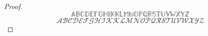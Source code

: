 \documentclass{article}
\theoremstyle{axiom} \newtheorem{axiom}{Axiom}
\theoremstyle{definition} \newtheorem{definition}{Definition}
\theoremstyle{example} \newtheorem{example}{Example}
\newcommand{\A}{\mathbb{A}}  \newcommand{\B}{\mathbb{B}}
\newcommand{\C}{\mathbb{C}}  \newcommand{\D}{\mathbb{D}}
\newcommand{\E}{\mathbb{E}}  \newcommand{\F}{\mathbb{F}}
\newcommand{\bG}{\mathbb{G}} \newcommand{\bH}{\mathbb{H}}
\newcommand{\I}{\mathbb{I}}  \newcommand{\J}{\mathbb{K}}
\newcommand{\K}{\mathbb{K}}  \newcommand{\bL}{\mathbb{L}}
\newcommand{\M}{\mathbb{M}}  \newcommand{\N}{\mathbb{N}}
\newcommand{\bO}{\mathbb{O}} \newcommand{\bP}{\mathbb{P}}
\newcommand{\Q}{\mathbb{Q}}  \newcommand{\R}{\mathbb{R}}
\newcommand{\bS}{\mathbb{S}} \newcommand{\T}{\mathbb{T}}
\newcommand{\U}{\mathbb{U}}  \newcommand{\V}{\mathbb{V}}
\newcommand{\W}{\mathbb{W}}  \newcommand{\X}{\mathbb{X}}
\newcommand{\Y}{\mathbb{Y}}  \newcommand{\Z}{\mathbb{Z}}
\newcommand{\sA}{\mathcal{A}}  \newcommand{\sB}{\mathcal{B}}
\newcommand{\sC}{\mathcal{C}}  \newcommand{\sD}{\mathcal{D}}
\newcommand{\sE}{\mathcal{E}}  \newcommand{\sF}{\mathcal{F}}
\newcommand{\sG}{\mathcal{G}}  \newcommand{\sH}{\mathcal{H}}
\newcommand{\sI}{\mathcal{I}}  \newcommand{\sJ}{\mathcal{K}}
\newcommand{\sK}{\mathcal{K}}  \newcommand{\sL}{\mathcal{L}}
\newcommand{\sM}{\mathcal{M}}  \newcommand{\sN}{\mathcal{N}}
\newcommand{\sO}{\mathcal{O}}  \newcommand{\sP}{\mathcal{P}}
\newcommand{\sQ}{\mathcal{Q}}  \newcommand{\sR}{\mathcal{R}}
\newcommand{\sS}{\mathcal{S}}  \newcommand{\sT}{\mathcal{T}}
\newcommand{\sU}{\mathcal{U}}  \newcommand{\sV}{\mathcal{V}}
\newcommand{\sW}{\mathcal{W}}  \newcommand{\sX}{\mathcal{X}}
\newcommand{\sY}{\mathcal{Y}}  \newcommand{\sZ}{\mathcal{Z}}
\begin{document}
\section*{}
\begin{mdframed}[style=Proof]
	\begin{proof}
		\begin{equation*}
			\A \B \C \D \E \F \bG \bH \I \J  \K \bL \M \N  \bO \bP \Q \R \bS \T
			\U \V \W \X \Y \Z
		\end{equation*}
		\begin{equation*}
			\sA \sB \sC \sD \sE \sF \sG \sH \sI \sJ  \sK \sL \sM \sN  \sO \sP 
			\sQ \sR \sS \sT \sU \sV \sW \sX \sY \sZ 
		\end{equation*}
	\end{proof}
\end{mdframed}
\end{document}
